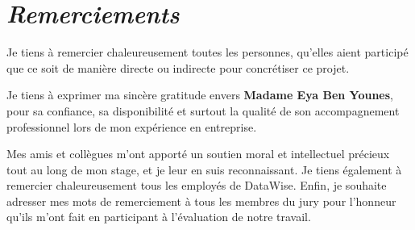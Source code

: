 \chapter*{\it Remerciements}
\large
Je tiens à remercier chaleureusement toutes les personnes, qu'elles aient participé que ce soit de manière directe ou indirecte pour concrétiser ce projet.
\\
\begin{center}
Je tiens à exprimer ma sincère gratitude envers   \textbf{Madame Eya Ben Younes}, pour sa confiance, sa disponibilité et surtout la qualité de son accompagnement professionnel lors de mon expérience en entreprise. \end{center}
\bigskip
\begin{center}
Mes amis et collègues m'ont apporté un soutien moral et intellectuel précieux tout au long de mon stage, et je leur en suis reconnaissant.
Je tiens également à remercier chaleureusement tous les employés de DataWise.
\newline
Enfin, je souhaite adresser mes mots de remerciement à tous les membres du jury pour l'honneur qu'ils m'ont fait en participant à l'évaluation de notre travail.

\end{center}

